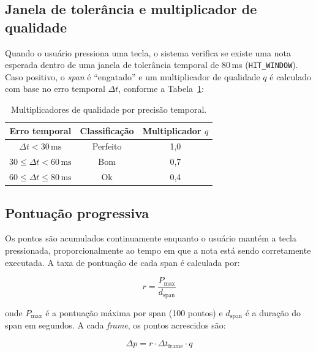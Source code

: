 \documentclass[
  12pt,
  openright,
  twoside,
  a4paper,
  english,
  brazil
]{abntex2}
\begin{document}
\subsection{Janela de tolerância e multiplicador de qualidade}

Quando o usuário pressiona uma tecla, o sistema verifica se existe uma
nota esperada dentro de uma janela de tolerância temporal de 80\,ms
(\texttt{HIT\_WINDOW}). Caso positivo, o \textit{span} é
``engatado'' e um multiplicador de qualidade $q$ é calculado com base
no erro temporal $\Delta t$, conforme a
Tabela~\ref{tab:multiplicadores}:

\begin{table}[htbp]
  \centering
  \caption{Multiplicadores de qualidade por precisão temporal.}
  \label{tab:multiplicadores}
  \begin{tabular}{@{}ccc@{}}
    \toprule
    \textbf{Erro temporal} & \textbf{Classificação} & \textbf{Multiplicador $q$} \\
    \midrule
    $\Delta t < 30\,\text{ms}$          & Perfeito & 1{,}0 \\
    $30 \leq \Delta t < 60\,\text{ms}$  & Bom      & 0{,}7 \\
    $60 \leq \Delta t \leq 80\,\text{ms}$ & Ok     & 0{,}4 \\
    \bottomrule
  \end{tabular}
\end{table}

\subsection{Pontuação progressiva}

Os pontos são acumulados continuamente enquanto o usuário mantém a tecla
pressionada, proporcionalmente ao tempo em que a nota está sendo
corretamente executada. A taxa de pontuação de cada span é calculada por:

\begin{equation}
  r = \frac{P_{\max}}{d_{\text{span}}}
  \label{eq:taxa}
\end{equation}

onde $P_{\max}$ é a pontuação máxima por span (100 pontos) e
$d_{\text{span}}$ é a duração do span em segundos. A cada
\textit{frame}, os pontos acrescidos são:

\begin{equation}
  \Delta p = r \cdot \Delta t_{\text{frame}} \cdot q
  \label{eq:delta-pontos}
\end{equation}
\end{document}
